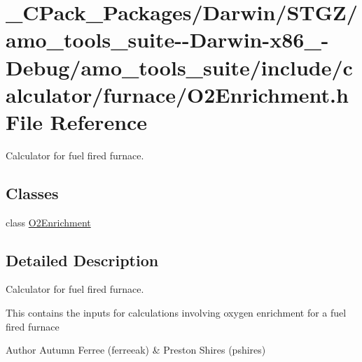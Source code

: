 \hypertarget{___c_pack___packages_2_darwin_2_s_t_g_z_2amo__tools__suite--_darwin-x86__64-_debug_2amo__tools__4edde237d4d4c2a51a71f2e4a7d321aa}{}\section{\+\_\+\+C\+Pack\+\_\+\+Packages/\+Darwin/\+S\+T\+G\+Z/amo\+\_\+tools\+\_\+suite-\/-\/\+Darwin-\/x86\+\_-\/\+Debug/amo\+\_\+tools\+\_\+suite/include/calculator/furnace/\+O2\+Enrichment.h File Reference}
\label{___c_pack___packages_2_darwin_2_s_t_g_z_2amo__tools__suite--_darwin-x86__64-_debug_2amo__tools__4edde237d4d4c2a51a71f2e4a7d321aa}


Calculator for fuel fired furnace.  


\subsection*{Classes}
\begin{DoxyCompactItemize}
\item 
class \hyperlink{class_o2_enrichment}{O2\+Enrichment}
\end{DoxyCompactItemize}


\subsection{Detailed Description}
Calculator for fuel fired furnace. 

This contains the inputs for calculations involving oxygen enrichment for a fuel fired furnace

\begin{DoxyAuthor}{Author}
Autumn Ferree (ferreeak) \& Preston Shires (pshires) 
\end{DoxyAuthor}
